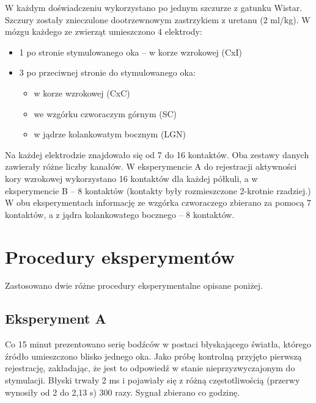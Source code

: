 \documentclass{pracamgr}
\begin{document}
	W każdym doświadczeniu wykorzystano po jednym szczurze z gatunku Wistar. Szczury zostały znieczulone dootrzewnowym zastrzykiem z uretanu (2 ml/kg). W mózgu każdego ze zwierząt umieszczono 4 elektrody:
	\begin{itemize}
		\item 1 po stronie stymulowanego oka -- w korze wzrokowej (CxI)
		\item 3 po przeciwnej stronie do stymulowanego oka:
		\begin{itemize}
			\item w korze wzrokowej (CxC)
			\item we wzgórku czworaczym górnym (SC)
			\item w jądrze kolankowatym bocznym (LGN)
		\end{itemize}
	\end{itemize}
	Na każdej elektrodzie znajdowało się od 7 do 16 kontaktów. Oba zestawy danych zawierały różne liczby kanałów. W eksperymencie A do rejestracji aktywności kory wzrokowej wykorzystano 16 kontaktów dla każdej półkuli, a w eksperymencie B -- 8 kontaktów (kontakty były rozmieszczone 2-krotnie rzadziej.) W obu eksperymentach informację ze wzgórka czworaczego zbierano za pomocą 7 kontaktów, a z jądra kolankowatego bocznego -- 8 kontaktów. 
	\section{Procedury eksperymentów}
	Zastosowano dwie różne procedury eksperymentalne opisane poniżej.
	\subsection{Eksperyment A}
	Co 15 minut prezentowano serię bodźców w postaci błyskającego światła, którego źródło umieszczono blisko jednego oka. Jako próbę kontrolną przyjęto pierwszą rejestrację, zakładając, że jest to odpowiedź w stanie nieprzyzwyczajonym do stymulacji. Błyski trwały 2 ms i pojawiały się z różną częstotliwością (przerwy wynosiły od 2 do 2,13 s) 300 razy. Sygnał zbierano co godzinę.
\end{document}
